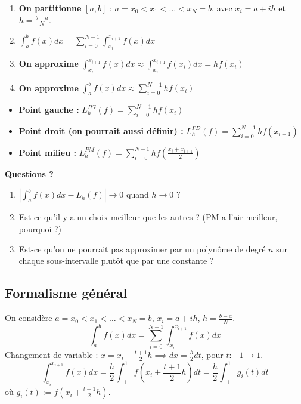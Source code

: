 \begin{enumerate}
    \item \textbf{On partitionne} $[a, b]$ : $a = x_0 < x_1 < \dots < x_N = b$, avec $x_i = a + ih$ et $h = \frac{b-a}{N}$.
    \item $\int_a^b f(x)dx = \sum_{i=0}^{N-1} \int_{x_i}^{x_{i+1}} f(x)dx$
    \item \textbf{On approxime} $\int_{x_i}^{x_{i+1}} f(x)dx \approx \int_{x_i}^{x_{i+1}} f(x_i)dx = h f(x_i)$
    \item \textbf{On approxime} $\int_a^b f(x)dx \approx \sum_{i=0}^{N-1} h f(x_i)$
\end{enumerate}

\begin{definition}\label{def:composites}
\begin{itemize}
    \item \textbf{Point gauche :} 
    $L_h^{PG}(f) = \sum_{i=0}^{N-1} h f(x_i)$
    \item \textbf{Point droit (on pourrait aussi définir) :} 
    $L_h^{PD}(f) = \sum_{i=0}^{N-1} h f(x_{i+1})$
    \item \textbf{Point milieu :} 
    $L_h^{PM}(f) = \sum_{i=0}^{N-1} h f\left(\frac{x_i + x_{i+1}}{2}\right)$
\end{itemize}
\end{definition}

\textbf{Questions ?}
\begin{enumerate}
    \item $|\int_a^b f(x)dx - L_h(f)| \to 0$ quand $h \to 0$ ?
    \item Est-ce qu'il y a un choix meilleur que les autres ? (PM a l'air meilleur, pourquoi ?)
    \item Est-ce qu'on ne pourrait pas approximer par un polynôme de degré $n$ sur chaque sous-intervalle plutôt que par une constante ?
\end{enumerate}

\subsection{Formalisme général}

On considère $a = x_0 < x_1 < \dots < x_N = b$, $x_i = a + ih$, $h = \frac{b-a}{N}$.
$$\int_a^b f(x)dx = \sum_{i=0}^{N-1} \int_{x_i}^{x_{i+1}} f(x)dx$$
Changement de variable : $x = x_i + \frac{t+1}{2}h \implies dx = \frac{h}{2}dt$, pour $t : -1 \to 1$.
$$\int_{x_i}^{x_{i+1}} f(x)dx = \frac{h}{2} \int_{-1}^{1} f\left(x_i + \frac{t+1}{2}h\right) dt = \frac{h}{2} \int_{-1}^{1} g_i(t)dt$$
où $g_i(t) := f\left(x_i + \frac{t+1}{2}h\right)$.


